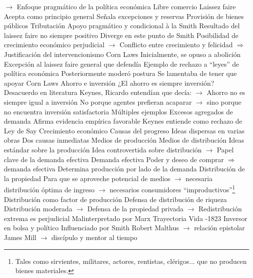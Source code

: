 \documentclass{nuevotema}
\begin{document}
\begin{esquemal}
				\4[] $\to$ Enfoque pragmático de la política económica
		\2 Libre comercio
			\3 Laissez faire
				\4 Acepta como principio general
				\4 Señala excepciones y reservas
				\4[$\to$] Provisión de bienes públicos
				\4[$\to$] Tributación
				\4[$\Rightarrow$] Apoyo pragmático y condicional à la Smith
				\4 Resultado del laissez faire no siempre positivo
				\4[] Diverge en este punto de Smith
				\4[] Posibilidad de crecimiento económico perjudicial
				\4[] $\to$ Conflicto entre crecimiento y felicidad
				\4[] $\Rightarrow$ Justificación del intervencionismo
			\3 Corn Laws
				\4 Inicialmente, se opuso a abolición
				\4[$\to$] Excepción al laissez faire general que defendía
				\4[$\to$] Ejemplo de rechazo a ``leyes'' de política económica
				\4 Posteriormente moderó postura
				\4[$\to$] Se lamentaba de tener que apoyar Corn Laws
		\2 Ahorro e inversión
			\3 ¿El ahorro es siempre inversión?
				\4 Desacuerdo en literatura
				\4 Keynes, Ricardo entendían que decía:
				\4[] $\to$ Ahorro no es siempre igual a inversión
				\4[] No porque agentes prefieran acaparar
				\4[] $\to$ sino porque no encuentra inversión satisfactoria
				\4[] Múltiples ejemplos
			\3 Excesos agregados de demanda
				\4 Afirma evidencia empírica favorable
				\4 Keynes entiende como rechazo de Ley de Say
		\2 Crecimiento económico
			\3 Causas del progreso
				\4 Ideas dispersas en varias obras
				\4 Dos causas inmediatas
				\4[] Medios de producción
				\4[] Medios de distribución
				\4 Ideas estándar sobre la producción
				\4 Idea controvertida sobre distribución
				\4[] $\to$ Papel clave de la demanda efectiva
			\3 Demanda efectiva
				\4 Poder y deseo de comprar $\Rightarrow$ demanda efectiva
				\4 Determina producción por lado de la demanda
			\3 Distribución de la propiedad
				\4 Para que se aproveche potencial de medios
				\4[] $\to$ necesaria distribución óptima de ingreso
				\4[] $\to$ necesarios consumidores ``improductivos''\footnote{Tales como sirvientes, militares, actores, rentistas, clérigos... que no producen bienes materiales.}
				\4[$\Rightarrow$] Distribución como factor de producción
				\4[$\Rightarrow$] Defensa de distribución de riqueza
				\4 Distribución moderada
				\4[] $\to$ Defensa de la propiedad privada
				\4[] $\to$ Redistribución extrema es perjudicial
				\4 Malinterpretado por Marx
	\1 
		\2 Trayectoria
			\3 Vida
				-1823
				\4 Inversor en bolsa y político
			\3 Influenciado por
				\4 Smith
				\4 Robert Malthus $\to$ relación epistolar
				\4 James Mill $\to$ discípulo y mentor al tiempo

\end{esquemal}
\end{document}
